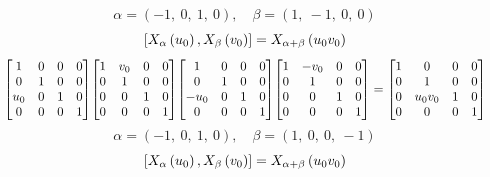 \documentclass[11pt]{article}
\theoremstyle{definition}
\begin{document}
\[
\alpha = \left( -1, \  0, \  1, \  0\right), \quad \beta = \left( 1, \  -1, \  0, \  0\right)
\]
\[
\scaletoalign{\textwidth}{\left[ X_{\alpha}\left(u_{0}\right), X_{\beta}\left(v_{0}\right) \right] = X_{\alpha + \beta}\left(u_{0} v_{0}\right)}
\]
\[
\scaletoalign{\textwidth}{{\left[\begin{matrix}1 & 0 & 0 & 0\\0 & 1 & 0 & 0\\u_{0} & 0 & 1 & 0\\0 & 0 & 0 & 1\end{matrix}\right]} {\left[\begin{matrix}1 & v_{0} & 0 & 0\\0 & 1 & 0 & 0\\0 & 0 & 1 & 0\\0 & 0 & 0 & 1\end{matrix}\right]} {\left[\begin{matrix}1 & 0 & 0 & 0\\0 & 1 & 0 & 0\\- u_{0} & 0 & 1 & 0\\0 & 0 & 0 & 1\end{matrix}\right]} {\left[\begin{matrix}1 & - v_{0} & 0 & 0\\0 & 1 & 0 & 0\\0 & 0 & 1 & 0\\0 & 0 & 0 & 1\end{matrix}\right]} = {\left[\begin{matrix}1 & 0 & 0 & 0\\0 & 1 & 0 & 0\\0 & u_{0} v_{0} & 1 & 0\\0 & 0 & 0 & 1\end{matrix}\right]}}
\]
\[
\alpha = \left( -1, \  0, \  1, \  0\right), \quad \beta = \left( 1, \  0, \  0, \  -1\right)
\]
\[
\scaletoalign{\textwidth}{\left[ X_{\alpha}\left(u_{0}\right), X_{\beta}\left(v_{0}\right) \right] = X_{\alpha + \beta}\left(u_{0} v_{0}\right)}
\]
\end{document}
